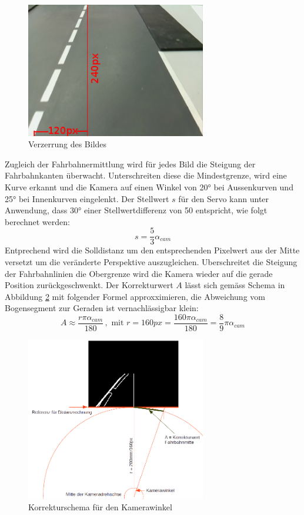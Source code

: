 \begin{figure}[H]%
\centering
\includegraphics[width=0.7\textwidth]{03_Loesungskonzept/pictures/Verzerrung.png}
\caption{Verzerrung des Bildes}
\label{fig:routeCorr}
\end{figure}
Zugleich der Fahrbahnermittlung wird für jedes Bild die Steigung der Fahrbahnkanten überwacht. Unterschreiten diese die Mindestgrenze, wird eine Kurve erkannt und die Kamera auf einen Winkel von 20° bei Aussenkurven und 25° bei Innenkurven eingelenkt. Der Stellwert $s$ für den Servo kann unter Anwendung, dass 30° einer Stellwertdifferenz von 50 entspricht, wie folgt berechnet werden: 
\[
s = \frac{5}{3}\alpha_{cam}
\]
Entprechend wird die Solldistanz um den entsprechenden Pixelwert aus der Mitte versetzt um die veränderte Perspektive auszugleichen. Uberschreitet die Steigung der Fahrbahnlinien die Obergrenze wird die Kamera wieder auf die gerade Position zurückgeschwenkt. Der Korrekturwert $A$ lässt sich gemäss Schema in Abbildung \ref{fig:corrCam} mit folgender Formel approxximieren, die Abweichung vom Bogensegment zur Geraden ist vernachlässigbar klein:
\[
A \approx \frac{r\pi\alpha_{cam}}{180} \,, \text{ mit }r=160px = \frac{160\pi\alpha_{cam}}{180} = \frac{8}{9}\pi\alpha_{cam}
\]
\begin{figure}[H]%
\centering
\includegraphics[width=0.7\textwidth]{03_Loesungskonzept/pictures/Kamerawinkelkorrektur.png}
\caption{Korrekturschema für den Kamerawinkel}
\label{fig:corrCam}
\end{figure}
